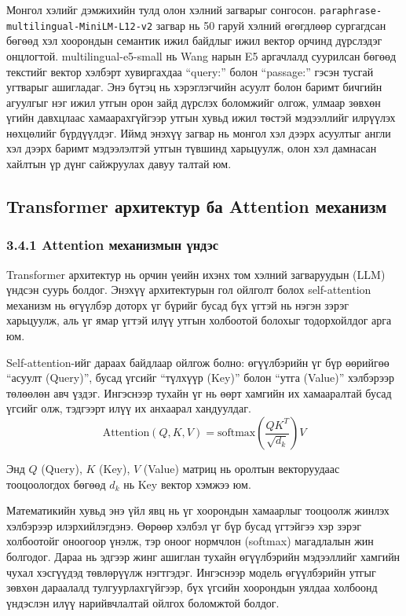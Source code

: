 \documentclass[11pt,a4paper]{article}
\begin{document}
Монгол хэлийг дэмжихийн тулд олон хэлний загварыг сонгосон. \texttt{paraphrase-multilingual-MiniLM-L12-v2} загвар нь 50 гаруй хэлний өгөгдлөөр сургагдсан бөгөөд хэл хоорондын семантик ижил байдлыг ижил вектор орчинд дүрслэдэг онцлогтой. multilingual-e5-small нь Wang нарын E5 аргачлалд суурилсан бөгөөд текстийг вектор хэлбэрт хувиргахдаа “query:” болон “passage:” гэсэн тусгай угтварыг ашигладаг. Энэ бүтэц нь хэрэглэгчийн асуулт болон баримт бичгийн агуулгыг нэг ижил утгын орон зайд дүрслэх боломжийг олгож, улмаар зөвхөн үгийн давхцлаас хамаарахгүйгээр утгын хувьд ижил төстэй мэдээллийг илрүүлэх нөхцөлийг бүрдүүлдэг. Иймд энэхүү загвар нь монгол хэл дээрх асуултыг англи хэл дээрх баримт мэдээлэлтэй утгын түвшинд харьцуулж, олон хэл дамнасан хайлтын үр дүнг сайжруулах давуу талтай юм.

\subsection{Transformer архитектур ба Attention механизм}

\subsubsection*{3.4.1 Attention механизмын үндэс}

Transformer архитектур нь орчин үеийн ихэнх том хэлний загваруудын (LLM) үндсэн суурь болдог. Энэхүү архитектурын гол ойлголт болох self-attention механизм нь өгүүлбэр доторх үг бүрийг бусад бүх үгтэй нь нэгэн зэрэг харьцуулж, аль үг ямар үгтэй илүү утгын холбоотой болохыг тодорхойлдог арга юм.

Self-attention-ийг дараах байдлаар ойлгож болно: өгүүлбэрийн үг бүр өөрийгөө “асуулт (Query)”, бусад үгсийг “түлхүүр (Key)” болон “утга (Value)” хэлбэрээр төлөөлөн авч үздэг. Ингэснээр тухайн үг нь өөрт хамгийн их хамааралтай бусад үгсийг олж, тэдгээрт илүү их анхаарал хандуулдаг.
\[
  \text{Attention}(Q, K, V) = \text{softmax}\!\left(\frac{QK^T}{\sqrt{d_k}}\right)V
\]

Энд $Q$ (Query), $K$ (Key), $V$ (Value) матриц нь оролтын векторуудаас тооцоологдох бөгөөд $d_k$ нь Key вектор хэмжээ юм.

Математикийн хувьд энэ үйл явц нь үг хоорондын хамаарлыг тооцоолж жинлэх хэлбэрээр илэрхийлэгдэнэ. Өөрөөр хэлбэл үг бүр бусад үгтэйгээ хэр зэрэг холбоотойг оноогоор үнэлж, тэр оноог нормчлон (softmax) магадлалын жин болгодог. Дараа нь эдгээр жинг ашиглан тухайн өгүүлбэрийн мэдээллийг хамгийн чухал хэсгүүдэд төвлөрүүлж нэгтгэдэг. Ингэснээр модель өгүүлбэрийн утгыг зөвхөн дараалалд тулгуурлахгүйгээр, бүх үгсийн хоорондын уялдаа холбоонд үндэслэн илүү нарийвчлалтай ойлгох боломжтой болдог. 
\end{document}

